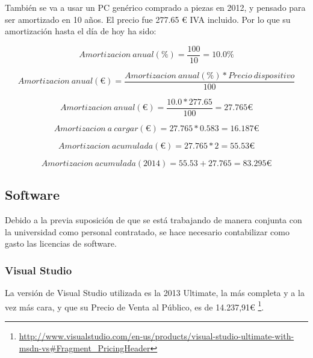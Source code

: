 Tambi\'{e}n se va a usar un PC gen\'{e}rico comprado a piezas en 2012, y pensado para
ser amortizado en 10 a\~nos. El precio fue 277.65 € IVA incluido.
Por lo que su amortizaci\'on hasta el d\'ia de hoy ha sido:

\begin{center}
\begin{equation}
Amortizacion \ anual (\%) = \frac{100}{10} = 10.0 \%
\end{equation}

\begin{equation}
Amortizacion \ anual (€) = \frac{Amortizacion \ anual(\%) * Precio \ dispositivo}{100}
\end{equation}

\begin{equation}
Amortizacion \ anual (€) = \frac{10.0 * 277.65}{100} = 27.765 €
\end{equation}

\begin{equation}
Amortizacion \ a \ cargar (€) = 27.765 * 0.583 = 16.187 €
\end{equation}

\begin{equation}
Amortizacion \ acumulada (€) = 27.765 * 2 = 55.53 €
\end{equation}

\begin{equation}
Amortizacion \ acumulada (2014) = 55.53 + 27.765 = 83.295 €
\end{equation}

\end{center}

\subsection{Software}
Debido a la previa suposici\'on de que se est\'a trabajando de manera conjunta con la 
universidad como personal contratado, se hace necesario contabilizar como gasto las licencias de software.

\subsubsection{Visual Studio}
La versi\'on de Visual Studio utilizada es la 2013 Ultimate, la m\'as completa y a la vez m\'as
cara, y que su Precio de Venta al P\'ublico, es de 14.237,91€ \footnote{\url{http://www.visualstudio.com/en-us/products/visual-studio-ultimate-with-msdn-vs\#Fragment_PricingHeader}}.

